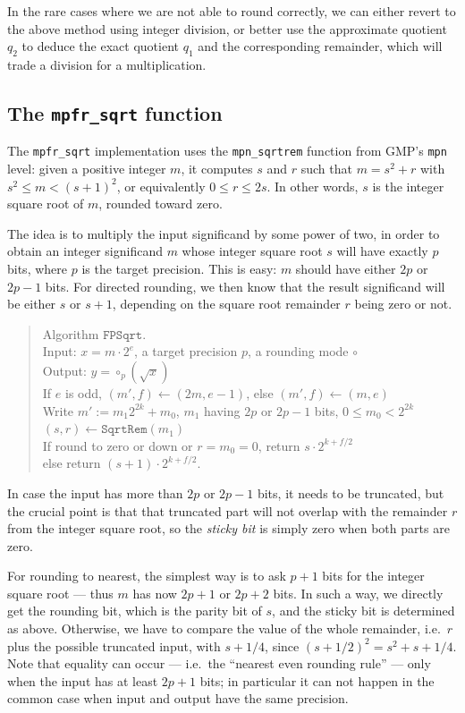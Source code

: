 \documentclass[12pt]{amsart}
\begin{document}
In the rare cases where we are not able to round correctly, we can either
revert to the above method using integer division, or better use the
approximate quotient $q_2$ to deduce the exact quotient $q_1$ and the
corresponding remainder, which will trade a division for a multiplication.

\subsection{The {\tt mpfr\_sqrt} function}

The \texttt{mpfr\_sqrt} implementation uses the \texttt{mpn\_sqrtrem}
function from GMP's \texttt{mpn} level:
given a positive integer $m$, it computes $s$ and $r$ such that
$m = s^2 + r$ with $s^2 \leq m < (s+1)^2$, or equivalently $0 \leq r \leq 2s$.
In other words, $s$ is the integer square root of $m$, rounded toward zero.

The idea is to multiply the input significand by some power of two,
in order to obtain an integer significand $m$ whose integer square root
$s$ will have exactly $p$ bits, where $p$ is the target precision.
This is easy: $m$ should have either $2p$ or $2p-1$ bits.
For directed rounding, we then know that the result significand will be
either $s$ or $s+1$, depending on the square root remainder $r$ being zero
or not.
\begin{quote}
Algorithm $\texttt{FPSqrt}$. \\
Input: $x = m \cdot 2^e$, a target precision $p$, a rounding mode $\circ$ \\
Output: $y = \circ_p(\sqrt{x})$ \\
If $e$ is odd, $(m', f) \leftarrow (2m, e-1)$, else $(m',f) \leftarrow (m,e)$ \\
Write $m' := m_1 2^{2k} + m_0$, $m_1$ having $2p$ or $2p-1$ bits, $0 \leq m_0 < 2^{2k}$ \\
$(s, r) \leftarrow \texttt{SqrtRem}(m_1)$ \\
If round to zero or down or $r=m_0=0$, return $s \cdot 2^{k+f/2}$ \\
else return $(s+1) \cdot 2^{k+f/2}$.
\end{quote}
In case the input has more than $2p$ or $2p-1$ bits, it needs to be truncated,
but the crucial point is that that truncated part will not overlap with the
remainder $r$ from the integer square root, so the \emph{sticky bit} is
simply zero when both parts are zero.

For rounding to nearest, the simplest way is to ask $p+1$ bits for the
integer square root --- thus $m$ has now $2p+1$ or $2p+2$ bits.
In such a way, we directly get the rounding bit, which is the parity bit
of $s$, and the sticky bit is determined as above.
Otherwise, we have to compare the value of the whole remainder, i.e.\ $r$ plus
the possible truncated input, with $s + 1/4$, since $(s+1/2)^2 =
s^2 + s + 1/4$.
Note that equality can occur --- i.e.\ the ``nearest even rounding rule'' ---
only when the input has at least $2p+1$ bits; in particular it can not
happen in the common case when input and output have the same precision.
\end{document}
